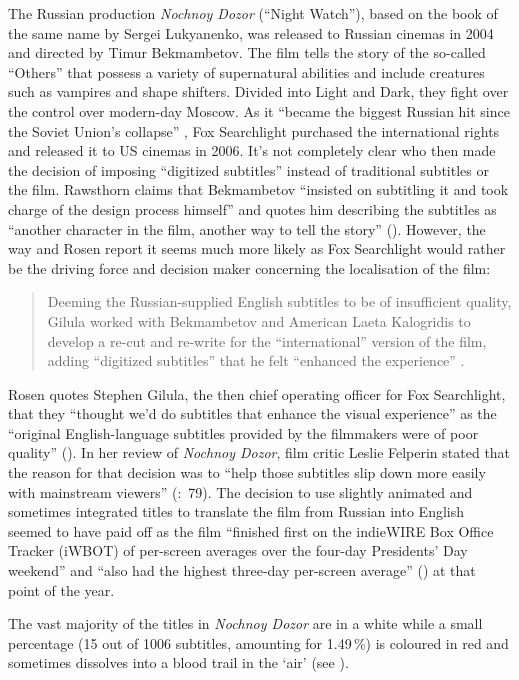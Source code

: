 The Russian production \textit{Nochnoy Dozor} (“Night Watch”), based on the book of the same name by Sergei Lukyanenko, was released to Russian cinemas in 2004 and directed by Timur Bekmambetov. The film tells the story of the so-called “Others” that possess a variety of supernatural abilities and include creatures such as vampires and shape shifters. Divided into Light and Dark, they fight over the control over modern-day Moscow. As it “became the biggest Russian hit since the Soviet Union’s collapse” \citep{rosen2006}, Fox Searchlight purchased the international rights and released it to US cinemas in 2006. It’s not completely clear who then made the decision of imposing “digitized subtitles” \citep{rosen2006} instead of traditional subtitles or  the film. Rawsthorn claims that Bekmambetov “insisted on subtitling it and took charge of the design process himself” and quotes him describing the subtitles as “another character in the film, another way to tell the story” (\citeyear{rawsthorn2007}). However, the way \citet{Kofoed2011} and Rosen report it seems much more likely as Fox Searchlight would rather be the driving force and decision maker concerning the localisation of the film:
\begin{quote}
Deeming the Russian-supplied English subtitles to be of insufficient quality, Gilula worked with Bekmambetov and American Laeta Kalogridis to develop a re-cut and re-write for the “international” version of the film, adding “digitized subtitles” that he felt “enhanced the experience” \citep{Kofoed2011}.
\end{quote}
Rosen quotes Stephen Gilula, the then chief operating officer for Fox Searchlight, that they “thought we’d do subtitles that enhance the visual experience” as the “original English-language subtitles provided by the filmmakers were of poor quality” (\citeyear{rosen2006}). In her review of \textit{Nochnoy Dozor}, film critic Leslie Felperin stated that the reason for that decision was to “help those subtitles slip down more easily with mainstream viewers” (\citeyear{Felperin2005}:~79). The decision to use slightly animated and sometimes integrated titles to translate the film from Russian into English seemed to have paid off as the film “finished first on the indieWIRE Box Office Tracker (iWBOT) of per-screen averages over the four-day Presidents' Day weekend” \citep{rosen2006} and “also had the highest three-day per-screen average” (\citeyear{rosen2006}) at that point of the year.

The vast majority of the titles in \textit{Nochnoy Dozor} are in a white   while a small percentage (15 out of 1006 subtitles, amounting for 1.49\,\%) is coloured in red and sometimes dissolves into a blood trail in the ‘air’ (see ). 


